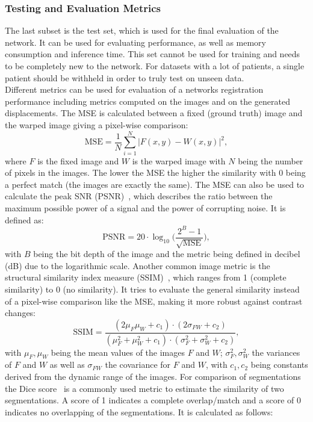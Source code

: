 \subsubsection{Testing and Evaluation Metrics} \label{SubSubSec:TestingEvalutionMetrics}
The last subset is the test set, which is used for the final evaluation of the network. It can be used for evaluating performance, as well as memory consumption and inference time. This set cannot be used for training and needs to be completely new to the network. For datasets with a lot of patients, a single patient should be withheld in order to truly test on unseen data. \\
Different metrics can be used for evaluation of a networks registration performance including metrics computed on the images and on the generated displacements. The MSE is calculated between a fixed (ground truth) image and the warped image giving a pixel-wise comparison:
\begin{equation}
	\text{MSE} = \frac{1}{N} \sum_{i=1}^{N} |F(x,y) - W(x,y)|^2,
\end{equation}
where $F$ is the fixed image and $W$ is the warped image with $N$ being the number of pixels in the images. The lower the MSE the higher the similarity with 0 being a perfect match (the images are exactly the same). The MSE can also be used to calculate the peak SNR (PSNR)~\cite{Ghoul2024}, which describes the ratio between the maximum possible power of a signal and the power of corrupting noise. It is defined as:
\begin{equation}
	\text{PSNR} = 20 \cdot \log_{10} \bigg(\frac{2^B - 1}{\sqrt{\text{MSE}}} \bigg),
\end{equation}
with $B$ being the bit depth of the image and the metric being defined in decibel (dB) due to the logarithmic scale. Another common image metric is the structural similarity index measure (SSIM)~\cite{SSIM}, which ranges from 1 (complete similarity) to 0 (no similarity). It tries to evaluate the general similarity instead of a pixel-wise comparison like the MSE, making it more robust against contrast changes:
\begin{equation}
	\text{SSIM} = \frac{(2 \mu_F \mu_W + c_1) \cdot (2 \sigma_{FW} + c_2)}{(\mu_F^2 + \mu_W^2 + c_1) \cdot (\sigma_F^2 + \sigma_W^2 + c_2) },
\end{equation}
with $\mu_F, \mu_W$ being the mean values of the images $F$ and $W$; $\sigma_F^2, \sigma_W^2$ the variances of $F$ and $W$ as well as $\sigma_{FW}$ the covariance for $F$ and $W$, with $c_1, c_2$ being constants derived from the dynamic range of the images. For comparison of segmentations the Dice score~\cite{Xiao2021} is a commonly used metric to estimate the similarity of two segmentations. A score of 1 indicates a complete overlap/match and a score of 0 indicates no overlapping of the segmentations. It is calculated as follows:
